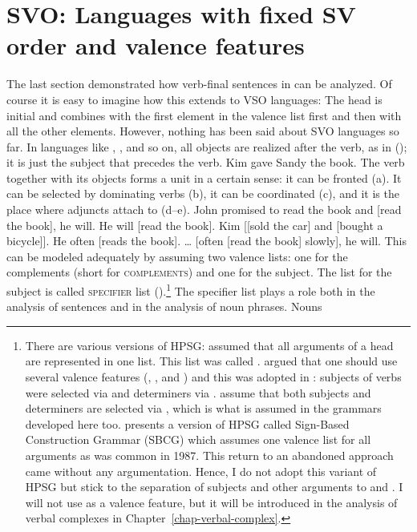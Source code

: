 
\section{SVO: Languages with fixed SV order and valence features}
\label{sec-intro-schemata}
\label{sec-intro-spr-comps}

The last section demonstrated how verb-final sentences in  can be analyzed. Of course it is
easy to imagine how this extends to VSO languages: The head is initial and combines with the first
element in the valence list first and then with all the other elements. However, nothing has been
said about SVO languages so far. In languages like , , and so on, all objects are
realized after the verb, as in (); it is just the subject that precedes the verb.
\ea
Kim gave Sandy the book.
\z
The verb together with its objects forms a unit in a certain sense: it can be fronted (a). It can be
selected by dominating verbs (b), it can be coordinated (c), and it is the place where adjuncts attach to (d--e).
\eal
\ex John promised to read the book and [read the book], he will.
\ex He will [read the book].
\ex Kim [[sold the car] and [bought a bicycle]]. 
\ex He often [reads the book].
\ex \ldots{} [often [read the book] slowly], he will.
\zl
This can be modeled adequately by assuming two valence lists: one for the complements (\comps short for \textsc{complements}) and
one for the subject. The list for the subject is called \textsc{specifier} list
(\spr).\footnote{%
  There are various versions of HPSG: \citet[Chapter~3.2]{ps} assumed that all arguments of a head are
  represented in one list. This list was called \subcatl. \citet{Borsley87a} argued that one should
  use several valence features (\subj, \spr, and \comps) and this was adopted in
  : subjects of verbs were selected via \subj and determiners via
  \spr. \citet*[Chapter~4.3]{SWB2003a} assume that both subjects and determiners are selected via \spr, which is
  what is assumed in the grammars developed here too. \citet[Section~3.3]{Sag2012a} presents a version of HPSG
  called Sign-Based Construction Grammar (SBCG) which assumes one valence list for all arguments as
  was common in 1987. This return to an abandoned approach came without any argumentation. Hence, I do not adopt this
  variant of HPSG but stick to the separation of subjects and other arguments to \spr and \comps. I
  will not use \subj as a valence feature, but it will be introduced in the analysis of verbal
  complexes in Chapter~\ref{chap-verbal-complex}.
} The specifier list plays a role both in the analysis of sentences and in the analysis of noun phrases. Nouns
